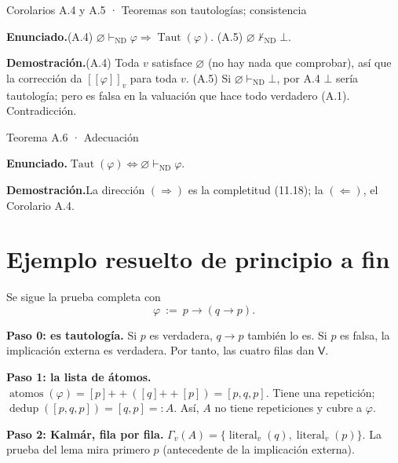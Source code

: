 \documentclass[11pt,a4paper]{article}
\newcommand{\campo}[1]{\par\smallskip\noindent\textbf{#1}\enspace}
\newcommand{\enunciado}{\campo{Enunciado.}}
\newcommand{\prueba}{\campo{Demostración.}}
\newcommand{\Provnd}{\vdash_{\mathrm{ND}}}
\newcommand{\Imp}{\rightarrow}
\newcommand{\sem}[1]{[\![#1]\!]}
\newcommand{\Taut}{\operatorname{Taut}}
\newcommand{\atomos}{\operatorname{atomos}}
\newcommand{\lit}{\operatorname{literal}}
\newcommand{\dedup}{\operatorname{dedup}}
\newcommand{\V}{\mathsf{V}}
\begin{document}
\begin{resultado}{Corolarios A.4 y A.5 · Teoremas son tautologías; consistencia}
\enunciado (A.4) \(\varnothing\Provnd\varphi\Rightarrow\Taut(\varphi)\).
(A.5) \(\varnothing\not\Provnd\bot\).

\prueba (A.4) Toda \(v\) satisface \(\varnothing\) (no hay nada que
comprobar), así que la corrección da \(\sem\varphi_v\) para toda \(v\).
(A.5) Si \(\varnothing\Provnd\bot\), por A.4 \(\bot\) sería tautología;
pero es falsa en la valuación que hace todo verdadero (A.1). Contradicción.
\end{resultado}

\begin{resultado}{Teorema A.6 · Adecuación}
\enunciado \(\Taut(\varphi)\iff\varnothing\Provnd\varphi\).

\prueba La dirección \((\Rightarrow)\) es la completitud (11.18); la
\((\Leftarrow)\), el Corolario A.4.
\end{resultado}

\section{Ejemplo resuelto de principio a fin}

Se sigue la prueba completa con
\[
\varphi\ :=\ p\Imp(q\Imp p).
\]

\textbf{Paso 0: es tautología.} Si \(p\) es verdadera, \(q\Imp p\) también lo
es. Si \(p\) es falsa, la implicación externa es verdadera. Por tanto, las cuatro
filas dan \(\V\).

\textbf{Paso 1: la lista de átomos.} \(\atomos(\varphi)=[p]\mathbin{+\!\!+}([q]\mathbin{+\!\!+}[p])=[p,q,p]\).
Tiene una repetición; \(\dedup([p,q,p])=[q,p]=:A\). Así, \(A\) no tiene
repeticiones y cubre a \(\varphi\).

\textbf{Paso 2: Kalmár, fila por fila.} \(\Gamma_v(A)=\{\lit_v(q),\lit_v(p)\}\).
La prueba del lema mira primero \(p\) (antecedente de la implicación externa).
\end{document}
